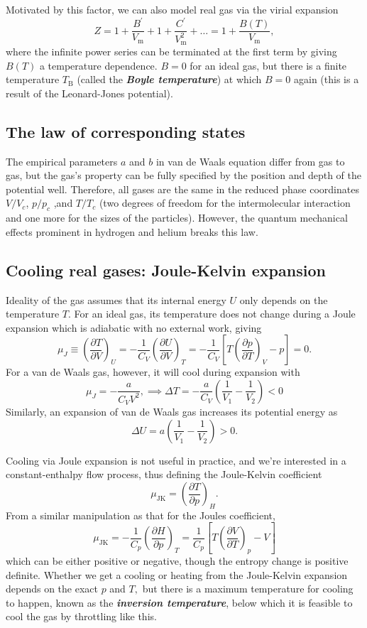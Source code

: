 \documentclass{article}
\theoremstyle{nonumberplain}
\begin{document}
Motivated by this factor, we can also model real gas via the virial expansion 
\[
    Z = 1 + \frac{B^\prime }{V_\mathrm{m}  } + 1 + \frac{C^\prime }{V_\mathrm{m}^2  } + \ldots  
    = 1 + \frac{B(T)}{V_\mathrm{m} }, 
\]
where the infinite power series can be terminated at the first term by giving $B(T)$ a temperature dependence. $B = 0$ for an ideal gas, but there is a finite temperature $T_\mathrm{B} $ (called the \textit{\textbf{Boyle temperature}}) at which $B = 0$ again (this is a result of the Leonard-Jones potential). 

\subsection{The law of corresponding states}
The empirical parameters $a$ and $b$ in van de Waals equation differ from gas to gas, but the gas's property can be fully specified by the position and depth of the potential well. Therefore, all gases are the same in the reduced phase coordinates $V/V_c$, $p / p_c$ ,and $T / T_c$ (two degrees of freedom for the intermolecular interaction and one more for the sizes of the particles). However, the quantum mechanical effects prominent in hydrogen and helium breaks this law. 
\subsection{Cooling real gases: Joule-Kelvin expansion}
Ideality of the gas assumes that its internal energy $U$ only depends on the temperature $T$. For an ideal gas, its temperature does not change during a Joule expansion which is adiabatic with no external work, giving 
\[
    \boxed{
    \mu_J \equiv \left(\frac{\partial T}{\partial V} \right)_U 
    = -\frac{1}{C_V} \left( \frac{\partial U}{\partial V} \right)_T}
    = -\frac{1}{C_V} \left[ T \left(\frac{\partial p}{\partial T} \right)_V - p\right]= 0.
\]
For a van de Waals gas, however, it will cool during expansion with 
\[
    \mu_J = -\frac{a}{C_V V^2}, \implies \Delta T = -\frac{a}{C_V} \left( \frac{1}{V_1} - \frac{1}{V_2}\right) <0
\]
Similarly, an  expansion of van de Waals gas increases its potential energy as 
\[
    \Delta U = a \left(\frac{1}{V_1} - \frac{1}{V_2}\right) >0.
\]

Cooling via Joule expansion is not useful in practice, and we're interested in a constant-enthalpy flow process, thus defining the Joule-Kelvin coefficient 
\[
    \mu_{\mathrm{JK}} = \left(\frac{\partial T}{\partial p}\right)_H. 
\]
From a similar manipulation as that for the Joules coefficient, 
\[
    \mu_{\mathrm{JK}} = -\frac{1}{C_p} \left(\frac{\partial H}{\partial p} \right)_T
    = \frac{1}{C_p} \left[ T\left(\frac{\partial V}{\partial T} \right)_p - V\right]
\]
which can be either positive or negative, though the entropy change is positive definite. Whether we get a cooling or heating from the Joule-Kelvin expansion depends on the exact $p$ and $T,$ but there is a maximum temperature for cooling to happen, known as the \textit{\textbf{inversion temperature}}, below which it is feasible to cool the gas by throttling like this.  
\end{document}
